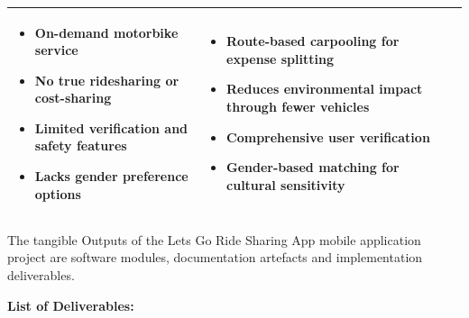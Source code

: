 \begin{table}[htbp]
\begin{tabularx}{\textwidth}{|p{3cm}|X|X|}
\begin{itemize}[leftmargin=*, noitemsep, topsep=0pt]
    \item On-demand motorbike service
    \item No true ridesharing or cost-sharing
    \item Limited verification and safety features
    \item Lacks gender preference options
\end{itemize}
&
\begin{itemize}[leftmargin=*, noitemsep, topsep=0pt]
    \item Route-based carpooling for expense splitting
    \item Reduces environmental impact through fewer vehicles
    \item Comprehensive user verification
    \item Gender-based matching for cultural sensitivity
\end{itemize}
\\
\hline
\end{tabularx}
\end{table}


The tangible Outputs of the Lets Go Ride Sharing App mobile application project are software modules, documentation artefacts and implementation deliverables.

\textbf{List of Deliverables:}

